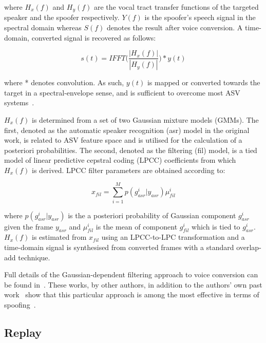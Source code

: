 \noindent where $H_{x}(f)$ and $H_{y}(f)$ are the vocal tract transfer functions of the targeted speaker and the spoofer respectively.  $Y(f)$ is the spoofer's speech signal in the spectral domain whereas $S(f)$ denotes the result after voice conversion. A time-domain, converted  signal is recovered as follows:

\begin{equation}
s(t) = IFFT \Bigg( \frac{\left|H_{x}(f)\right|}{\left|H_{y}(f)\right|} \Bigg) *y(t)
\label{eq:conversioneq_t}
\end{equation}

\noindent where * denotes convolution. As such, $y(t)$ is mapped or converted towards the target in a spectral-envelope sense, and is sufficient to overcome most ASV systems~\cite{Matrouf2005, Bonastre2006}.

$H_x(f)$ is determined from a set of two Gaussian mixture models (GMMs).  The first, denoted as the automatic speaker recognition (asr) model in the original work, is related to ASV feature space and is utilised for the calculation of a posteriori probabilities.  The second, denoted as the filtering (fil) model, is a tied model of linear predictive cepstral coding (LPCC) coefficients from which $H_x(f)$ is derived.  LPCC filter parameters are obtained according to:

\begin{equation}
x_{fil} = \sum\limits_{i=1}^{M}p(g_{asr}^{i}|y_{asr}) \mu_{fil}^{i}
\label{eq:EMit}
\end{equation}

\noindent where $p(g_{asr}^{i}|y_{asr})$ is the a posteriori probability of Gaussian component $g_{asr}^{i}$ given the frame $y_{asr}$ and $\mu_{fil}^{i}$ is the mean of component $g_{fil}^{i}$ which is tied to $g_{asr}^{i}$.  $H_{x}(f)$ is estimated from $x_{fil}$ using an LPCC-to-LPC transformation and a time-domain signal is synthesised from converted frames with a standard overlap-add technique.  

Full details of the Gaussian-dependent filtering approach to voice conversion can be found in~\cite{Matrouf2005, Bonastre2006, Bonastre2007}.  These works, by other authors, in addition to the authors' own past work~\cite{Alegre2012a,Alegre2013,Alegre2013a} show that this particular approach is among the most effective in terms of spoofing~\cite{Wu2014a}.



\subsection{Replay}
\label{ssec:replay}

